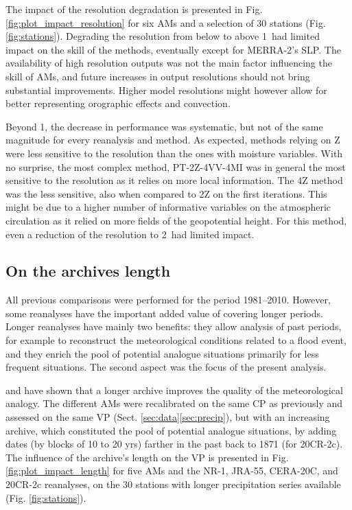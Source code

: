 \documentclass{ametsoc}
\begin{document}
The impact of the resolution degradation is presented in Fig. \ref{fig:plot_impact_resolution} for six AMs and a selection of 30 stations (Fig. \ref{fig:stations}). Degrading the resolution from below to above 1\degree\ had limited impact on the skill of the methods, eventually except for MERRA-2's SLP. The availability of high resolution outputs was not the main factor influencing the skill of AMs, and future increases in output resolutions should not bring substantial improvements. Higher model resolutions might however allow for better representing orographic effects and convection. 

Beyond 1\degree, the decrease in performance was systematic, but not of the same magnitude for every reanalysis and method. As expected, methods relying on Z were less sensitive to the resolution than the ones with moisture variables. With no surprise, the most complex method, PT-2Z-4VV-4MI was in general the most sensitive to the resolution as it relies on more local information. The 4Z method was the less sensitive, also when compared to 2Z on the first iterations. This might be due to a higher number of informative variables on the atmospheric circulation as it relied on more fields of the geopotential height. For this method, even a reduction of the resolution to 2\degree\ had limited impact.


\subsection{On the archives length}
\label{sec:length}

All previous comparisons were performed for the period 1981--2010. However, some reanalyses have the important added value of covering longer periods. Longer reanalyses have mainly two benefits: they allow analysis of past periods, for example to reconstruct the meteorological conditions related to a flood event, and they enrich the pool of potential analogue situations primarily for less frequent situations. The second aspect was the focus of the present analysis. 

\citet{Ruosteenoja1988} and \citet{Vandendool1994} have shown that a longer archive improves the quality of the meteorological analogy. The different AMs were recalibrated on the same CP as previously and assessed on the same VP (Sect. \ref{sec:data}\ref{sec:precip}), but with an increasing archive, which constituted the pool of potential analogue situations, by adding dates (by blocks of 10 to 20 yrs) farther in the past back to 1871 (for 20CR-2c). The influence of the archive's length on the VP is presented in Fig. \ref{fig:plot_impact_length} for five AMs and the NR-1, JRA-55, CERA-20C, and 20CR-2c reanalyses, on the 30 stations with longer precipitation series available (Fig. \ref{fig:stations}). 
\end{document}

